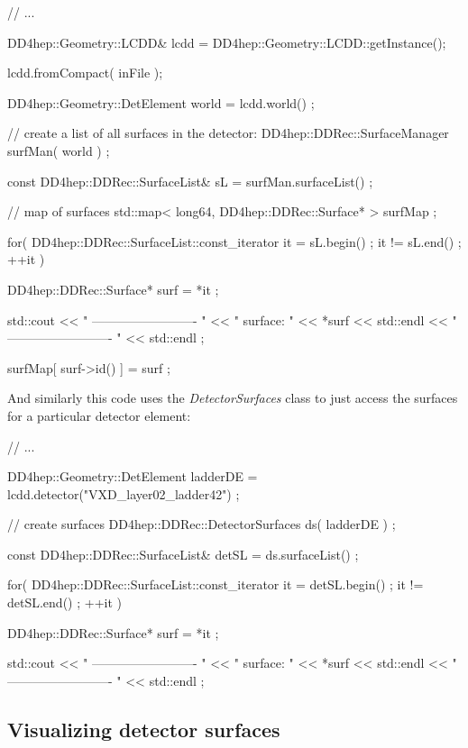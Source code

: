 \documentclass[10pt,a4paper]{article}
\begin{document}
\begin{code}
  // ...

  DD4hep::Geometry::LCDD& lcdd = DD4hep::Geometry::LCDD::getInstance();

  lcdd.fromCompact( inFile );

  DD4hep::Geometry::DetElement world = lcdd.world() ;

  // create a list of all surfaces in the detector:
  DD4hep::DDRec::SurfaceManager surfMan(  world ) ;

  const DD4hep::DDRec::SurfaceList& sL = surfMan.surfaceList() ;

  // map of surfaces
  std::map< long64, DD4hep::DDRec::Surface* > surfMap ;

  for( DD4hep::DDRec::SurfaceList::const_iterator it = sL.begin() ; it != sL.end() ; ++it ){
    
    DD4hep::DDRec::Surface* surf =  *it ;
    
    std::cout << " ------------------------- " 
      	      << " surface: "  << *surf         << std::endl
      	      << " ------------------------- "  << std::endl ;
    
    surfMap[ surf->id() ] = surf ;
  }

\end{code}

\noindent
And similarly this code uses the {\em DetectorSurfaces} class to just access the surfaces 
for a particular detector element:

\begin{code}
  // ...

  DD4hep::Geometry::DetElement ladderDE = lcdd.detector("VXD_layer02_ladder42") ;

  // create surfaces
  DD4hep::DDRec::DetectorSurfaces ds( ladderDE ) ;

  const DD4hep::DDRec::SurfaceList& detSL = ds.surfaceList() ;

  for( DD4hep::DDRec::SurfaceList::const_iterator it = detSL.begin() ; it != detSL.end() ; ++it ){

    DD4hep::DDRec::Surface* surf =  *it ;

    std::cout << " ------------------------- " 
      	      << " surface: "  << *surf         << std::endl
      	      << " ------------------------- "  << std::endl ;
  }
\end{code}

\subsection{Visualizing detector surfaces}
\label{subsec:ddrec-surfaces-visualization}
\end{document}

